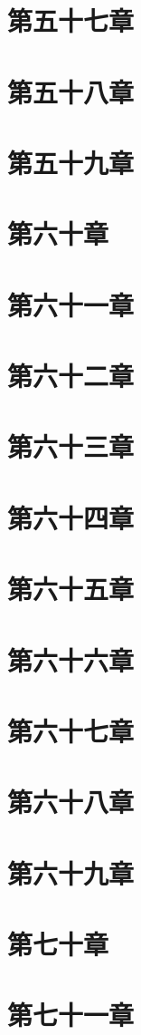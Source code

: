 \documentclass[UTF8]{ctexart}
\begin{document}
	\section{第五十七章}
	\section{第五十八章}
	\section{第五十九章}
	\section{第六十章}
	\section{第六十一章}
	\section{第六十二章}
	\section{第六十三章}
	\section{第六十四章}
	\section{第六十五章}
	\section{第六十六章}
	\section{第六十七章}
	\section{第六十八章}
	\section{第六十九章}
	\section{第七十章}
	\section{第七十一章}
\end{document}

